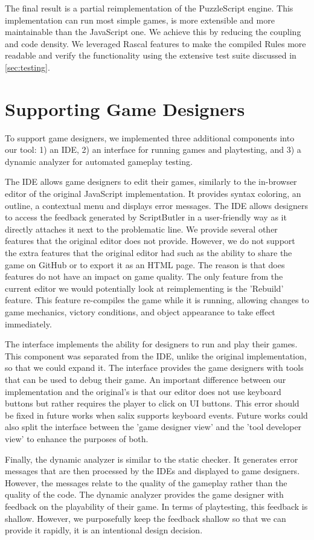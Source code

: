 The final result is a partial reimplementation of the PuzzleScript engine. This implementation can run most simple games, is more extensible and more maintainable than the JavaScript one. We achieve this by reducing the coupling and code density. We leveraged Rascal features to make the compiled Rules more readable and verify the functionality using the extensive test suite discussed in \ref{sec:testing}.

\section{Supporting Game Designers}
To support game designers, we implemented three additional components into our tool: 1) an IDE, 2) an interface for running games and playtesting, and 3) a dynamic analyzer for automated gameplay testing.

The IDE allows game designers to edit their games, similarly to the in-browser editor of the original JavaScript implementation. It provides syntax coloring, an outline, a contextual menu and displays error messages. The IDE allows designers to access the feedback generated by ScriptButler in a user-friendly way as it directly attaches it next to the problematic line. We provide several other features that the original editor does not provide. However, we do not support the extra features that the original editor had such as the ability to share the game on GitHub or to export it as an HTML page. The reason is that does features do not have an impact on game quality. The only feature from the current editor we would potentially look at reimplementing is the 'Rebuild' feature. This feature re-compiles the game while it is running, allowing changes to game mechanics, victory conditions, and object appearance to take effect immediately. 

The interface implements the ability for designers to run and play their games. This component was separated from the IDE, unlike the original implementation, so that we could expand it. The interface provides the game designers with tools that can be used to debug their game. An important difference between our implementation and the original's is that our editor does not use keyboard buttons but rather requires the player to click on UI buttons. This error should be fixed in future works when salix supports keyboard events. Future works could also split the interface between the 'game designer view' and the 'tool developer view' to enhance the purposes of both.

Finally, the dynamic analyzer is similar to the static checker. It generates error messages that are then processed by the IDEs and displayed to game designers. However, the messages relate to the quality of the gameplay rather than the quality of the code. The dynamic analyzer provides the game designer with feedback on the playability of their game. In terms of playtesting, this feedback is shallow. However, we purposefully keep the feedback shallow so that we can provide it rapidly, it is an intentional design decision.


